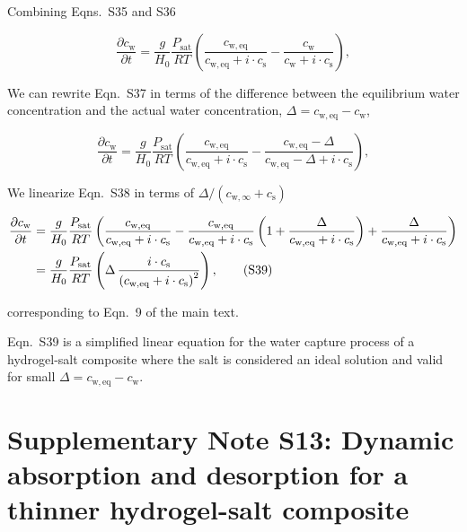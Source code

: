 \documentclass[11pt]{article}
\begin{document}
Combining Eqns.~S35 and S36

\begin{equation}
\frac{\partial c_\mathrm{w}}{\partial t} = \frac{g}{H_0}\frac{P_\mathrm{sat}}{RT}\left(\frac{c_\mathrm{w,eq}}{c_\mathrm{w,eq}+i\cdot c_\mathrm{s}} - \frac{c_\mathrm{w}}{c_\mathrm{w}+i\cdot c_\mathrm{s}}\right), \tag{S37}
\end{equation}

We can rewrite Eqn.~S37 in terms of the difference between the equilibrium water concentration and the actual water concentration, $\Delta = c_\mathrm{w,eq} - c_\mathrm{w}$,

\begin{equation}
\frac{\partial c_\mathrm{w}}{\partial t} = \frac{g}{H_0}\frac{P_\mathrm{sat}}{RT}\left(\frac{c_\mathrm{w,eq}}{c_\mathrm{w,eq}+i\cdot c_\mathrm{s}} - \frac{c_\mathrm{w,eq}-\Delta}{c_\mathrm{w,eq}-\Delta+i\cdot c_\mathrm{s}}\right), \tag{S38}
\end{equation}

We linearize Eqn.~S38 in terms of $\Delta/(c_\mathrm{w,\infty}+c_\mathrm{s})$

\begin{align}
\frac{\partial c_\mathrm{w}}{\partial t} &= \frac{g}{H_0}\frac{P_\mathrm{sat}}{RT}\left(\frac{c_\mathrm{w,eq}}{c_\mathrm{w,eq}+i\cdot c_\mathrm{s}} - \frac{c_\mathrm{w,eq}}{c_\mathrm{w,eq}+i\cdot c_\mathrm{s}}\left(1+\frac{\Delta}{c_\mathrm{w,eq}+i\cdot c_\mathrm{s}}\right) + \frac{\Delta}{c_\mathrm{w,eq}+i\cdot c_\mathrm{s}}\right) \notag\\
&= \frac{g}{H_0}\frac{P_\mathrm{sat}}{RT}\left(\Delta\, \frac{i\cdot c_\mathrm{s}}{\left(c_\mathrm{w,eq}+i\cdot c_\mathrm{s}\right)^2}\right), \tag{S39}
\end{align}

corresponding to Eqn.~9 of the main text.

Eqn.~S39 is a simplified linear equation for the water capture process of a hydrogel-salt composite where the salt is considered an ideal solution and valid for small $\Delta = c_\mathrm{w,eq} - c_\mathrm{w}$.

\clearpage

\section*{Supplementary Note S13: Dynamic absorption and desorption for a thinner hydrogel-salt composite}
\end{document}
